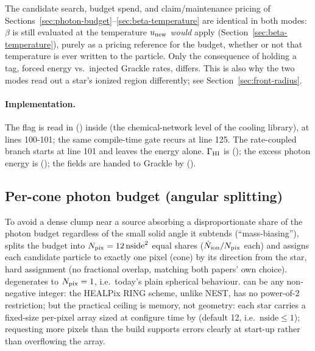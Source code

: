 The candidate search, budget spend, and claim/maintenance pricing of
Sections~\ref{sec:photon-budget}--\ref{sec:beta-temperature} are
identical in both modes: $\beta$ is still evaluated at the temperature
$u_{\rm new}$ \emph{would} apply (Section~\ref{sec:beta-temperature}),
purely as a pricing reference for the budget, whether or not that
temperature is ever written to the particle. Only the consequence of
holding a tag, forced energy vs.\ injected Grackle rates, differs.
This is also why the two modes read out a star's ionized region
differently; see Section~\ref{sec:front-radius}.

\paragraph{Implementation.} The flag is read in
() inside
 (the chemical-network level of the cooling library), at lines 100-101; the same compile-time
gate recurs at line 125. The rate-coupled branch starts at line 101 and leaves the energy alone.
$\Gamma_{\rm HI}$ is
(); the excess photon energy is
(); the fields are handed to
Grackle by 
().

\subsection{Per-cone photon budget (angular splitting)}
\label{sec:angular-splitting}

To avoid a dense clump near a source absorbing a disproportionate
share of the photon budget regardless of the small solid angle it
subtends (``mass-biasing''),  splits the
budget into $N_{\rm pix} = 12\,{\rm nside}^2$ equal shares
($\dot N_{\rm ion}/N_{\rm pix}$ each) and assigns each candidate
particle to exactly one pixel (cone) by its direction from the star,
hard assignment (no fractional overlap, matching both papers' own
choice).  degenerates to $N_{\rm pix}=1$, i.e.\ today's
plain spherical behaviour.  can be any non-negative
integer: the HEALPix RING scheme, unlike NEST, has no power-of-2
restriction; but the practical ceiling is memory, not geometry: each
star carries a fixed-size per-pixel array sized at configure time by
 (default 12, i.e.\
$\text{nside}\le1$); requesting more pixels than the build supports
errors clearly at start-up rather than overflowing the array.

